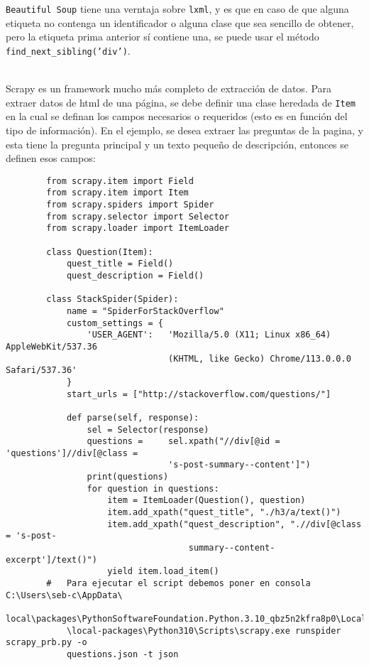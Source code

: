    \texttt{Beautiful Soup} tiene una verntaja sobre \texttt{lxml}, y es que en caso de que alguna etiqueta no contenga un identificador o alguna clase que sea sencillo de obtener, pero la etiqueta prima anterior sí contiene una, se puede usar el método \texttt{find\_next\_sibling('div')}. \\\




    Scrapy es un framework mucho más completo de extracción de datos. Para extraer datos de html de una página, se debe definir una clase heredada de \texttt{Item} en la cual se definan los campos necesarios o requeridos (esto es en función del tipo de información). En el ejemplo, se desea extraer las preguntas de la pagina, y esta tiene la pregunta principal y un texto pequeño de descripción, entonces se definen esos campos:

    \begin{verbatim}
        from scrapy.item import Field
        from scrapy.item import Item
        from scrapy.spiders import Spider
        from scrapy.selector import Selector
        from scrapy.loader import ItemLoader
            
        class Question(Item):
            quest_title = Field()
            quest_description = Field()
            
        class StackSpider(Spider):
            name = "SpiderForStackOverflow"
            custom_settings = {
                'USER_AGENT':   'Mozilla/5.0 (X11; Linux x86_64) AppleWebKit/537.36 
                                (KHTML, like Gecko) Chrome/113.0.0.0 Safari/537.36'
            }
            start_urls = ["http://stackoverflow.com/questions/"]
            
            def parse(self, response):
                sel = Selector(response)
                questions =     sel.xpath("//div[@id = 'questions']//div[@class = 
                                's-post-summary--content']")
                print(questions)
                for question in questions:
                    item = ItemLoader(Question(), question)
                    item.add_xpath("quest_title", "./h3/a/text()")
                    item.add_xpath("quest_description", ".//div[@class = 's-post-
                                    summary--content-excerpt']/text()")
                    yield item.load_item()
        #   Para ejecutar el script debemos poner en consola C:\Users\seb-c\AppData\
            local\packages\PythonSoftwareFoundation.Python.3.10_qbz5n2kfra8p0\LocalCache
            \local-packages\Python310\Scripts\scrapy.exe runspider scrapy_prb.py -o 
            questions.json -t json
    \end{verbatim}


